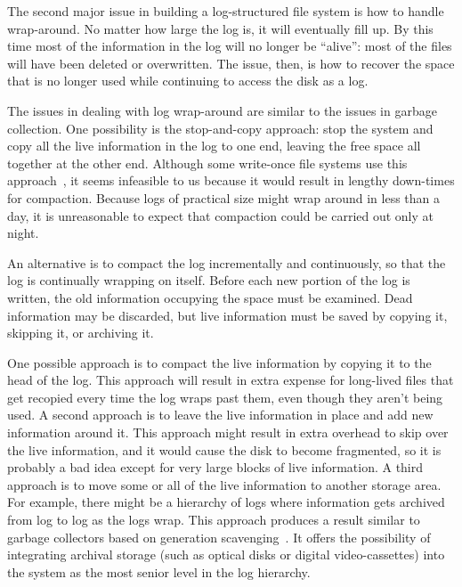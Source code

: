 The second major issue in building a log-structured file system
is how to handle wrap-around.  No matter how large the log is, it
will eventually fill up.  By this time most of the information in
the log will no longer be ``alive'':  most of the files will have
been deleted or overwritten.  The issue,
then, is how to recover the 
space that is no longer used while continuing to access the disk
as a log.

The issues in dealing with log wrap-around are similar to the issues
in garbage collection.
One possibility is the stop-and-copy approach:  stop the
system and copy all the live
information in the log to one end, leaving the free space all together
at the other end.  Although some write-once file systems use this
approach~\cite{gait:ofc,garfinkel:cdfs}, it seems infeasible to us because
it would result in lengthy down-times for compaction.  Because
logs of practical size might wrap around in less than a day, it is
unreasonable to expect  that
compaction could  be carried out only at night.


An alternative is to compact the log incrementally and
continuously, so that the log is continually wrapping on itself.
Before each new portion of the log is written,
the old information occupying the space must be examined.
Dead information may be discarded, but live information must be
saved by copying it, skipping it, or archiving it.

One possible approach is to compact the live information by
copying it to the head of the log.
This approach will result in extra
expense for long-lived files that get recopied every time the log
wraps past them, even though they aren't being used.  A second
approach is to leave the live information in place and add new
information around it.  This approach might result in extra overhead
to skip over the live information, and it would cause
the disk to become fragmented,
so it is probably a bad idea except for very large blocks of live
information.
A third
approach is to move some or all of the live information to another
storage area.  For example, there might be a hierarchy of logs where
information gets archived from log to log as the logs wrap.
This approach produces a result similar to garbage collectors
based on generation scavenging~\cite{ungar:gen-scav}.
It offers the possibility of integrating archival storage (such as
optical disks or digital video-cassettes)
into the system as the most senior level in the log
hierarchy.

